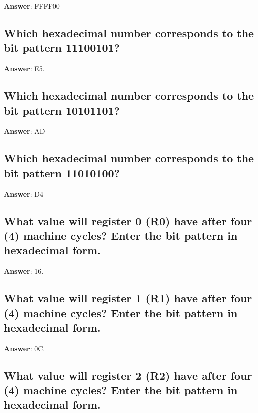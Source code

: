 \documentclass[a4paper,11pt,oneside]{article}
\begin{document}
\begin{sloppypar}
\label{q:426:sa:en:True}

\textbf{Answer}: FFFF00



\subsection{Which hexadecimal number corresponds to the bit pattern 11100101?}

\label{q:427:sa:en:True}

\textbf{Answer}: E5.



\subsection{Which hexadecimal number corresponds to the bit pattern 10101101?}

\label{q:428:sa:en:True}

\textbf{Answer}: AD



\subsection{Which hexadecimal number corresponds to the bit pattern 11010100?}

\label{q:429:sa:en:True}

\textbf{Answer}: D4



\subsection{What value will register 0 (R0) have after four (4) machine cycles? Enter the bit pattern in hexadecimal form.}

\label{q:430:sa:en:True}

\textbf{Answer}: 16.



\subsection{What value will register 1 (R1) have after four (4) machine cycles? Enter the bit pattern in hexadecimal form.}

\label{q:431:sa:en:True}

\textbf{Answer}: 0C.



\subsection{What value will register 2 (R2) have after four (4) machine cycles? Enter the bit pattern in hexadecimal form.}


\end{sloppypar}
\end{document}
